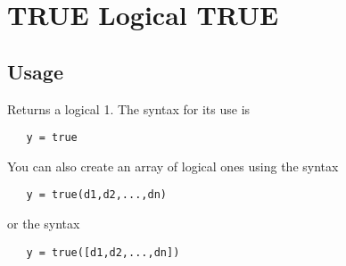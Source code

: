\section{TRUE Logical TRUE}

\subsection{Usage}

Returns a logical 1.  The syntax for its use is
\begin{verbatim}
   y = true
\end{verbatim}
You can also create an array of logical ones using
the syntax
\begin{verbatim}
   y = true(d1,d2,...,dn)
\end{verbatim}
or the syntax
\begin{verbatim}
   y = true([d1,d2,...,dn])
\end{verbatim}
